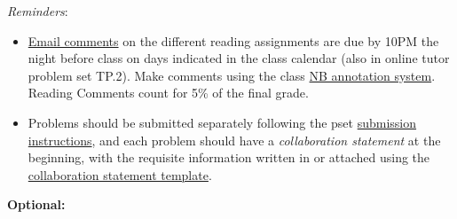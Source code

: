 \documentclass[handout]{mcs}
\begin{document}
\renewcommand{\reading}{Part~\bref{part:proofs}{. \emph{Proofs:
      Introduction}}, Chapter~\bref{proofs_chap}{, \emph{What is a
      Proof?}}; Chapter~\bref{well_ordering_chap}{, \emph{The Well
      Ordering Principle}}; and Chapter~\bref{logicform_chap}{ through
    \bref{SAT_sec}{, covering \emph{Propositional Logic}}}.  These
  assigned readings \textbf{do not include the Problem sections}.  (Many
  of the problems in the text will appear as class or homework problems.)}


  \emph{Reminders}:
\begin{itemize}

\item 

  \href{http://courses.csail.mit.edu/6.042/spring12/courseinfo#comments}{Email
    comments} on the different reading assignments are due by 10PM the
  night before class on days indicated in the class calendar (also in
  online tutor problem set TP.2).  Make comments using the class
  \href{http://nb.csail.mit.edu}{NB annotation system}.  Reading
  Comments count for 5\% of the final grade.

\item Problems should be submitted separately following the pset
  \href{http://courses.csail.mit.edu/6.042/spring12/submission}{submission
    instructions}, and each problem should have a \emph{collaboration
    statement} at the beginning, with the requisite information
  written in or attached using the
  \href{http://courses.csail.mit.edu/6.042/spring12/submission_template.pdf}{collaboration
    statement template}.

 \end{itemize}







\begin{center}
\large \textbf{Optional:}
\end{center}


\end{document}
